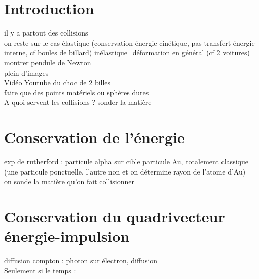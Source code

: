 


\biblio{}

\section*{Introduction}
il y a partout des collisions \\
on reste sur le cas élastique (conservation énergie cinétique, pas transfert énergie interne, cf boules de billard) inélastique=déformation en général (cf 2 voitures) \\
montrer pendule de Newton \\
plein d'images \\
\href{https://www.youtube.com/watch?v=4v2RHtBTbj8}{Vidéo Youtube du choc de 2 billes} \\
faire que des points matériels ou sphères dures \\
A quoi servent les collisions ? sonder la matière \\

\section{Conservation de l'énergie}
exp de rutherford : particule alpha sur cible particule Au, totalement classique (une particule ponctuelle, l'autre non et on détermine rayon de l'atome d'Au) \\
on sonde la matière qu'on fait collisionner \\

\section{Conservation du quadrivecteur énergie-impulsion}
diffusion compton : photon sur électron, diffusion \\


\bigskip
Seulement si le temps : 
